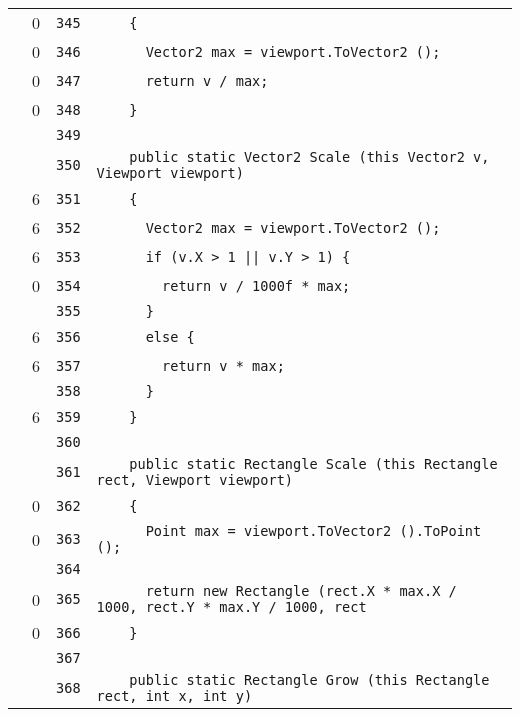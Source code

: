 \documentclass[a4paper,10pt]{article}
\begin{document}
\begin{longtable}[l]{lrrl}
\cellcolor{red} & 0 & \verb~345~ & \verb~    {~\\
\cellcolor{red} & 0 & \verb~346~ & \verb~      Vector2 max = viewport.ToVector2 ();~\\
\cellcolor{red} & 0 & \verb~347~ & \verb~      return v / max;~\\
\cellcolor{red} & 0 & \verb~348~ & \verb~    }~\\
\cellcolor{gray} &  & \verb~349~ & \verb~~\\
\cellcolor{gray} &  & \verb~350~ & \verb~    public static Vector2 Scale (this Vector2 v, Viewport viewport)~\\
\cellcolor{green} & 6 & \verb~351~ & \verb~    {~\\
\cellcolor{green} & 6 & \verb~352~ & \verb~      Vector2 max = viewport.ToVector2 ();~\\
\cellcolor{green} & 6 & \verb~353~ & \verb~      if (v.X > 1 || v.Y > 1) {~\\
\cellcolor{red} & 0 & \verb~354~ & \verb~        return v / 1000f * max;~\\
\cellcolor{gray} &  & \verb~355~ & \verb~      }~\\
\cellcolor{green} & 6 & \verb~356~ & \verb~      else {~\\
\cellcolor{green} & 6 & \verb~357~ & \verb~        return v * max;~\\
\cellcolor{gray} &  & \verb~358~ & \verb~      }~\\
\cellcolor{green} & 6 & \verb~359~ & \verb~    }~\\
\cellcolor{gray} &  & \verb~360~ & \verb~~\\
\cellcolor{gray} &  & \verb~361~ & \verb~    public static Rectangle Scale (this Rectangle rect, Viewport viewport)~\\
\cellcolor{red} & 0 & \verb~362~ & \verb~    {~\\
\cellcolor{red} & 0 & \verb~363~ & \verb~      Point max = viewport.ToVector2 ().ToPoint ();~\\
\cellcolor{gray} &  & \verb~364~ & \verb~~\\
\cellcolor{red} & 0 & \verb~365~ & \verb~      return new Rectangle (rect.X * max.X / 1000, rect.Y * max.Y / 1000, rect~\\
\cellcolor{red} & 0 & \verb~366~ & \verb~    }~\\
\cellcolor{gray} &  & \verb~367~ & \verb~~\\
\cellcolor{gray} &  & \verb~368~ & \verb~    public static Rectangle Grow (this Rectangle rect, int x, int y)~\\

\end{longtable}
\end{document}
